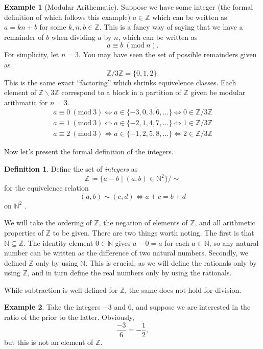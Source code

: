 \documentclass{article}
\newcommand{\N}{\mathbb{N}}
\newcommand{\Z}{\mathbb{Z}}
\theoremstyle{definition}
\newtheorem{definition}{Definition}[section]
\newtheorem{example}{Example}[section]
\begin{document}
	\begin{example}[Modular Arithematic]
		Suppose we have some integer (the formal definition of which follows this example) $a\in \Z$ which can be written as $ a = kn + b$ for some $k,n,b\in \Z$. This is a fancy way of saying that we have a remainder of $b$ when dividing $a$ by $n$, which can be written as  
		$$ a\equiv b\ (\text{mod}\ n).$$
		For simplicity, let $n = 3$. You may have seen the set of possible remainders given as 
		$$\Z/3\Z = \{0,1,2\} .$$ This is the same exact ``factoring'' which shrinks equivelence classes. Each element of $\Z\backslash 3\Z$ correspond to a block in a partition of $\Z$ given be modular arithmatic for $n=3$. 
		\begin{align*}
			a\equiv 0\ (\text{mod}\ 3)\iff a\in \{-3,0,3,6,\ldots \}\iff 0 \in \Z/3\Z\\
			a\equiv 1\ (\text{mod}\ 3)\iff a\in \{-2,1,4,7,\ldots \}\iff 1\in \Z/3\Z\\
			a\equiv 2\ (\text{mod}\ 3)\iff a\in \{-1,2,5,8,\ldots \}\iff 2 \in \Z/3\Z
		\end{align*} 
	\end{example}
	
	Now let's present the formal definition of the integers.
	\begin{definition}\label{def}
		Define the set of \textit{\color{red}integers} as $$ \Z\coloneqq\{a-b\mid(a,b)\in\N^2\}/\sim $$ for the equivelence relation 
		$$  (a,b)\sim(c,d) \iff  a+c=b+d $$ on $\N^2$ . 
	\end{definition}
	
	 We will take the ordering of $ \Z $, the negation of elements of $ \Z $, and all arithmetic properties of $ \Z $ to be given. There are two things worth noting. The first is that $ \N\subseteq\Z $. The identity element $ 0\in\N $ gives $ a-0=a $ for each $ a\in\N $, so any natural number can be written as the difference of two natural numbers. Secondly, we defined $ \Z $ only by using $ \N $. This is crucial, as we will define the rationals only by using $ \Z $, and in turn define the real numbers only by using the rationals.
	
	While subtraction is well defined for $ \Z $, the same does not hold for division. 
	\begin{example}
		Take the integers $ -3 $ and 6, and suppose we are interested in the ratio of the prior to the latter. Obviously, $$ \frac{-3}{6}=-\frac{1}{2} ,$$ but this is not an element of $ \Z $. 
	\end{example}
\end{document}
